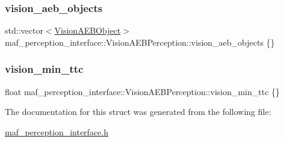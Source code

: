 \subsubsection{\texorpdfstring{vision\+\_\+aeb\+\_\+objects}{vision\_aeb\_objects}}
{\footnotesize\ttfamily std\+::vector$<$\hyperlink{structmaf__perception__interface_1_1VisionAEBObject}{Vision\+A\+E\+B\+Object}$>$ maf\+\_\+perception\+\_\+interface\+::\+Vision\+A\+E\+B\+Perception\+::vision\+\_\+aeb\+\_\+objects \{\}}

\mbox{\label{structmaf__perception__interface_1_1VisionAEBPerception_aa9bcee4c8754d7b71ffe4f1f5f88841c}} 
\subsubsection{\texorpdfstring{vision\+\_\+min\+\_\+ttc}{vision\_min\_ttc}}
{\footnotesize\ttfamily float maf\+\_\+perception\+\_\+interface\+::\+Vision\+A\+E\+B\+Perception\+::vision\+\_\+min\+\_\+ttc \{\}}



The documentation for this struct was generated from the following file\+:\begin{DoxyCompactItemize}
\item 
\hyperlink{maf__perception__interface_8h}{maf\+\_\+perception\+\_\+interface.\+h}\end{DoxyCompactItemize}
